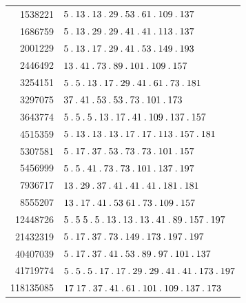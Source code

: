 %
\begingroup\small\setlength{\tabcolsep}{5pt}
\begin{longtable}{@{}r|l@{}}
1538221 & $5\pdot 13\pdot 13\pdot 29\pdot 53\pdot 61\pdot 109\pdot 137$\\
1686759 & $5\pdot 13\pdot 29\pdot 29\pdot 41\pdot 41\pdot 113\pdot 137$\\
2001229 & $5\pdot 13\pdot 17\pdot 29\pdot 41\pdot 53\pdot 149\pdot 193$\\
2446492 & $13\pdot 41\pdot 73\pdot 89\pdot 101\pdot 109\pdot 157$\\
3254151 & $5\pdot 5\pdot 13\pdot 17\pdot 29\pdot 41\pdot 61\pdot 73\pdot 181$\\
3297075 & $37\pdot 41\pdot 53\pdot 53\pdot 73\pdot 101\pdot 173$\\
3643774 & $5\pdot 5\pdot 5\pdot 13\pdot 17\pdot 41\pdot 109\pdot 137\pdot 157$\\
4515359 & $5\pdot 13\pdot 13\pdot 13\pdot 17\pdot 17\pdot 113\pdot 157\pdot 181$\\
5307581 & $5\pdot 17\pdot 37\pdot 53\pdot 73\pdot 73\pdot 101\pdot 157$\\
5456999 & $5\pdot 5\pdot 41\pdot 73\pdot 73\pdot 101\pdot 137\pdot 197$\\
7936717 & $13\pdot 29\pdot 37\pdot 41\pdot 41\pdot 41\pdot 181\pdot 181$\\
8555207 & $13\pdot 17\pdot 41\pdot 53\;61\pdot 73\pdot 109\pdot 157$\\
12448726 & $5\pdot 5\;5\pdot 5\pdot 13\pdot 13\pdot 13\pdot 41\pdot 89\pdot 157\pdot 197$\\
21432319 & $5\pdot 17\pdot 37\pdot 73\pdot 149\pdot 173\pdot 197\pdot 197$\\
40407039 & $5\pdot 17\pdot 37\pdot 41\pdot 53\pdot 89\pdot 97\pdot 101\pdot 137$\\
41719774 & $5\pdot 5\pdot 5\pdot 17\pdot 17\pdot 29\pdot 29\pdot 41\pdot 41\pdot 173\pdot 197$\\
118135085 & $17\;17\pdot 37\pdot 41\pdot 61\pdot 101\pdot 109\pdot 137\pdot 173$\\
\end{longtable}\endgroup
\par\medskip\begingroup\small\setlength{\tabcolsep}{5pt}
